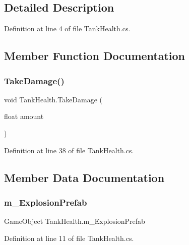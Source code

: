 \subsection{Detailed Description}


Definition at line 4 of file Tank\+Health.\+cs.



\subsection{Member Function Documentation}
\mbox{\label{class_tank_health_a5b4692ca0cdcd290c19819b612a1fb6a}} 
\subsubsection{\texorpdfstring{Take\+Damage()}{TakeDamage()}}
{\footnotesize\ttfamily void Tank\+Health.\+Take\+Damage (\begin{DoxyParamCaption}\item[{float}]{amount }\end{DoxyParamCaption})}



Definition at line 38 of file Tank\+Health.\+cs.



\subsection{Member Data Documentation}
\mbox{\label{class_tank_health_a5ef8047ad181f98b49f021dcb2a79eff}} 
\subsubsection{\texorpdfstring{m\+\_\+\+Explosion\+Prefab}{m\_ExplosionPrefab}}
{\footnotesize\ttfamily Game\+Object Tank\+Health.\+m\+\_\+\+Explosion\+Prefab}



Definition at line 11 of file Tank\+Health.\+cs.

\mbox{\label{class_tank_health_afe7189f28749f37650eaee5bbe1e9569}} 
